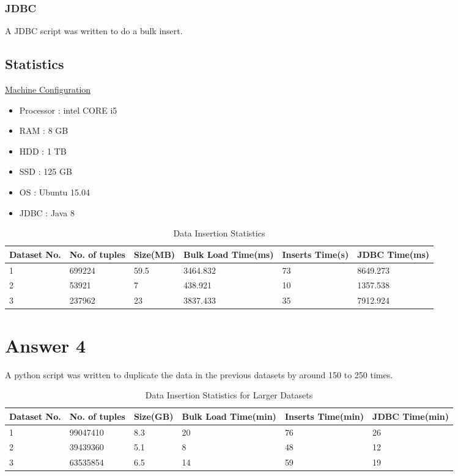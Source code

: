 \documentclass[10pt]{article}
\begin{document}
\subsubsection{JDBC}
A JDBC script was written to do a bulk insert.
\subsection{Statistics}
\underline{Machine Configuration}
\begin{itemize}
\item Processor : intel CORE i5
\item RAM : 8 GB
\item HDD : 1 TB
\item SSD : 125 GB
\item OS : Ubuntu 15.04
\item JDBC : Java 8
\end{itemize}

\begin{table}[h!]
\centering
\caption{Data Insertion Statistics}
  \label{tab:table}
  \vspace{5mm}
  \begin{tabular}{|p{2cm}|p{2cm}|p{1.5cm}|p{3.5cm}|p{3cm}|p{3cm}|}
  \hline
  Dataset No. & No. of tuples & Size(MB) & Bulk Load Time(ms) & Inserts Time(s) & JDBC Time(ms)\\
  \hline
  1 & 699224 & 59.5 & 3464.832 & 73 & 8649.273\\
  \hline
  2 & 53921 & 7 & 438.921 & 10 & 1357.538\\
  \hline
  3 & 237962 & 23 & 3837.433 & 35 & 7912.924 \\
  \hline
  \end{tabular}
\end{table}
\section{Answer 4}
A python script was written to duplicate the data in the previous datasets  by around 150 to 250 times.
\begin{table}[h!]
\centering
\caption{Data Insertion Statistics for Larger Datasets}
  \label{tab:table}
  \vspace{5mm}
   \begin{tabular}{|p{2cm}|p{2cm}|p{1.5cm}|p{3.5cm}|p{3cm}|p{3cm}|}
  \hline
  Dataset No. & No. of tuples & Size(GB) & Bulk Load Time(min) & Inserts Time(min) & JDBC Time(min)\\
  \hline
  1 & 99047410 & 8.3 & 20 & 76 & 26\\
  \hline
  2 & 39439360 & 5.1 & 8 & 48 & 12\\
  \hline
  3 & 63535854 & 6.5 & 14 & 59 & 19\\
  \hline
  \end{tabular}
\end{table}
\end{document}
